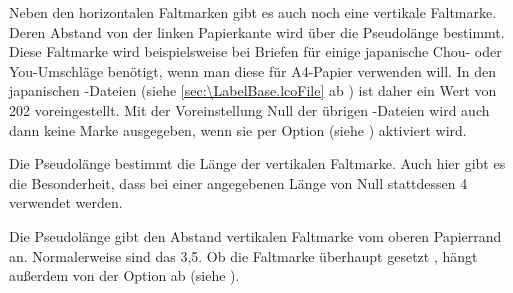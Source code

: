 \begin{Declaration}
\end{Declaration}
Neben den horizontalen Faltmarken gibt es
auch noch eine vertikale Faltmarke. Deren Abstand von der linken Papierkante
wird über die Pseudolänge  bestimmt. Diese Faltmarke
wird beispielsweise bei Briefen für einige japanische Chou- oder You-Umschläge
benötigt, wenn man diese für A4-Papier verwenden
will. In den japanischen
-Dateien (siehe
\autoref{sec:\LabelBase.lcoFile} ab ) ist
daher ein Wert von 202 voreingestellt. Mit der Voreinstellung Null
der übrigen -Dateien wird auch dann keine Marke ausgegeben, wenn sie
per Option %
%
 (siehe
) aktiviert wird.%
\EndIndexGroup


\begin{Declaration}
\end{Declaration}
Die Pseudolänge  bestimmt
die Länge der vertikalen
Faltmarke. Auch  hier gibt es die Besonderheit, dass bei
einer angegebenen Länge von Null stattdessen 4 verwendet werden.%
\EndIndexGroup


\begin{Declaration}
\end{Declaration}
Die Pseudolänge gibt den Abstand
 vertikalen Faltmarke vom oberen Papier\-rand
an. Normalerweise sind das 3{,}5. %
%
Ob die Faltmarke überhaupt gesetzt , hängt
außerdem von der Option %
%
 ab (siehe
).%
\EndIndexGroup


